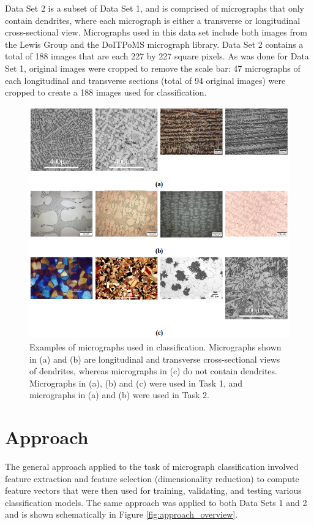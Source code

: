 Data Set 2 is a subset of Data Set 1, and is comprised of micrographs that only contain dendrites, where each micrograph is either a transverse or longitudinal cross-sectional view.  Micrographs used in this data set include both images from the Lewis Group and the DoITPoMS micrograph library.  Data Set 2 contains a total of 188 images that are each 227 by 227 square pixels. As was done for Data Set 1, original images were cropped to remove the scale bar: 47 micrographs of each longitudinal and transverse sections (total of 94 original images) were cropped to create a 188 images used for classification.
%
\begin{figure}
  \begin{centering}
 \includegraphics[scale=0.55]{img/example_images_v2.png}
 \caption{Examples of micrographs used in classification.  Micrographs shown in (a) and (b) are longitudinal and transverse cross-sectional views of dendrites, whereas micrographs in (c) do not contain dendrites.  Micrographs in (a), (b) and (c) were used in Task 1, and micrographs in (a) and (b) were used in Task 2.}
 \label{fig:example_images}
 \end{centering}
\end{figure}
\section{Approach}
\label{approach}
%
The general approach applied to the task of micrograph classification involved feature extraction and feature selection (dimensionality reduction) to compute feature vectors that were then used for training, validating, and testing various classification models.  The same approach was applied to both Data Sets 1 and 2 and is shown schematically in Figure \ref{fig:approach_overview}.

